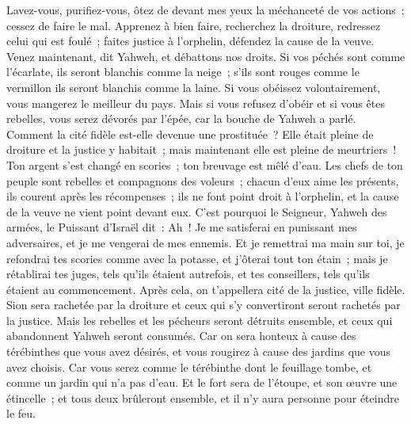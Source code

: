 \begin{multicols}{2}
Lavez-vous, purifiez-vous, ôtez de devant mes yeux la méchanceté de vos actions~; cessez de faire le mal.
Apprenez à bien faire, recherchez la droiture, redressez celui qui est foulé~; faites justice à l'orphelin, défendez la cause de la veuve.
Venez maintenant, dit Yahweh, et débattons nos droits. Si vos péchés sont comme l'écarlate, ils seront blanchis comme la neige~; s'ils sont rouges comme le vermillon ils seront blanchis comme la laine.
Si vous obéissez volontairement, vous mangerez le meilleur du pays.
Mais si vous refusez d'obéir et si vous êtes rebelles, vous serez dévorés par l'épée, car la bouche de Yahweh a parlé.
Comment la cité fidèle est-elle devenue une prostituée~? Elle était pleine de droiture et la justice y habitait~; mais maintenant elle est pleine de meurtriers~!
Ton argent s'est changé en scories~; ton breuvage est mêlé d'eau. 
Les chefs de ton peuple sont rebelles et compagnons des voleurs~; chacun d'eux aime les présents, ils courent après les récompenses~; ils ne font point droit à l'orphelin, et la cause de la veuve ne vient point devant eux. 
C'est pourquoi le Seigneur, Yahweh des armées, le Puissant d'Israël dit~: Ah~! Je me satisferai en punissant mes adversaires, et je me vengerai de mes ennemis. 
Et je remettrai ma main sur toi, je refondrai tes scories comme avec la potasse, et j'ôterai tout ton étain~;
mais je rétablirai tes juges, tels qu'ils étaient autrefois, et tes conseillers, tels qu'ils étaient au commencement. Après cela, on t'appellera cité de la justice, ville fidèle.
Sion sera rachetée par la droiture et ceux qui s'y convertiront seront rachetés par la justice.
Mais les rebelles et les pécheurs seront détruits ensemble, et ceux qui abandonnent Yahweh seront consumés.
Car on sera honteux à cause des térébinthes que vous avez désirés, et vous rougirez à cause des jardins que vous avez choisis.
Car vous serez comme le térébinthe dont le feuillage tombe, et comme un jardin qui n'a pas d'eau.
Et le fort sera de l'étoupe, et son œuvre une étincelle~; et tous deux brûleront ensemble, et il n'y aura personne pour éteindre le feu.

\end{multicols}
